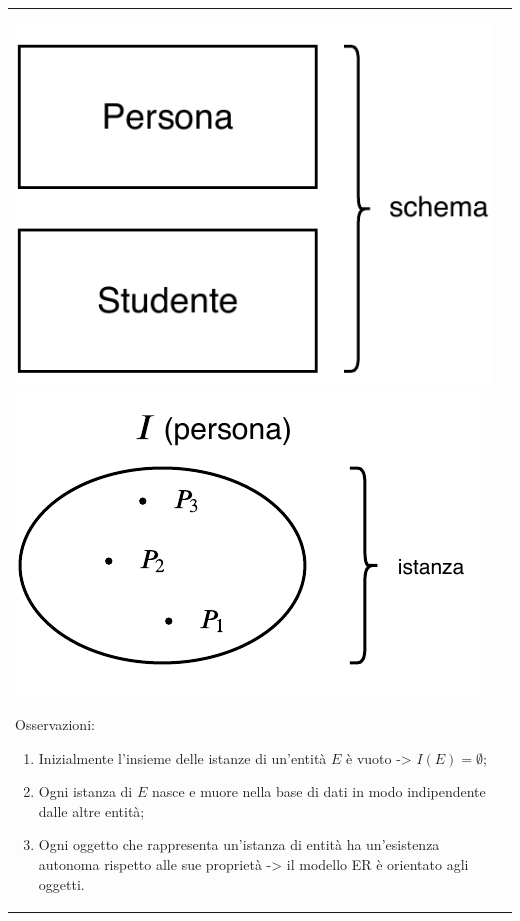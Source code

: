 \documentclass[a4paper, 10pt]{report}
\begin{document}
\begin{longtable}{| p{} | p{} |}
\begin{center}
\includegraphics[scale=0.4]{img2.pdf}
\hspace{1cm}
\includegraphics[scale=0.5]{img3.pdf}
\end{center}

Osservazioni:
\begin{enumerate}
\item Inizialmente l'insieme delle istanze di un'entità $E$ è vuoto -> $I(E) = \emptyset$;
\item Ogni istanza di $E$ nasce e muore nella base di dati in modo indipendente dalle altre entità;
\item Ogni oggetto che rappresenta un'istanza di entità ha un'esistenza autonoma rispetto alle sue proprietà -> il modello ER è orientato agli oggetti.
\end{enumerate}\\


\end{longtable}
\end{document}
